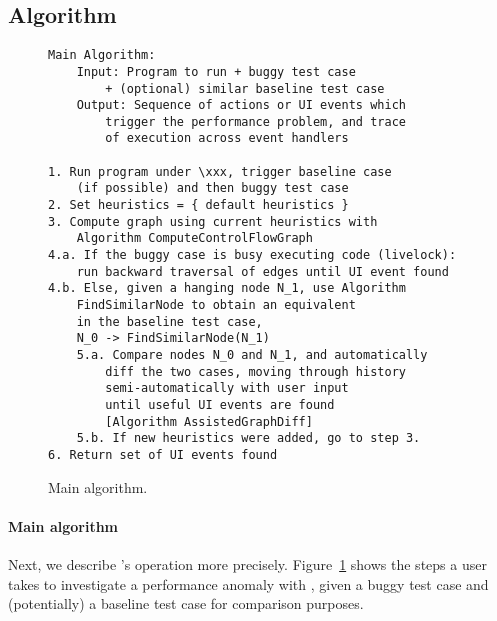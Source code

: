 \subsection{\xxx Algorithm}

\begin{figure}[tb]
\footnotesize\begin{verbatim}
Main Algorithm:
    Input: Program to run + buggy test case
        + (optional) similar baseline test case
    Output: Sequence of actions or UI events which
        trigger the performance problem, and trace
        of execution across event handlers

1. Run program under \xxx, trigger baseline case
    (if possible) and then buggy test case
2. Set heuristics = { default heuristics }
3. Compute graph using current heuristics with
    Algorithm ComputeControlFlowGraph
4.a. If the buggy case is busy executing code (livelock):
    run backward traversal of edges until UI event found
4.b. Else, given a hanging node N_1, use Algorithm
    FindSimilarNode to obtain an equivalent
    in the baseline test case,
    N_0 -> FindSimilarNode(N_1)
    5.a. Compare nodes N_0 and N_1, and automatically
        diff the two cases, moving through history
        semi-automatically with user input
	    until useful UI events are found
        [Algorithm AssistedGraphDiff]
    5.b. If new heuristics were added, go to step 3.
6. Return set of UI events found
\end{verbatim}
    \caption{Main \xxx algorithm.}
    \label{fig:alg-main}
\end{figure}


\paragraph{Main algorithm} Next, we describe \xxx's operation more precisely.
Figure~\ref{fig:alg-main} shows the steps a user takes to investigate a
performance anomaly with \xxx, given a buggy test case and (potentially) a
baseline test case for comparison purposes.

